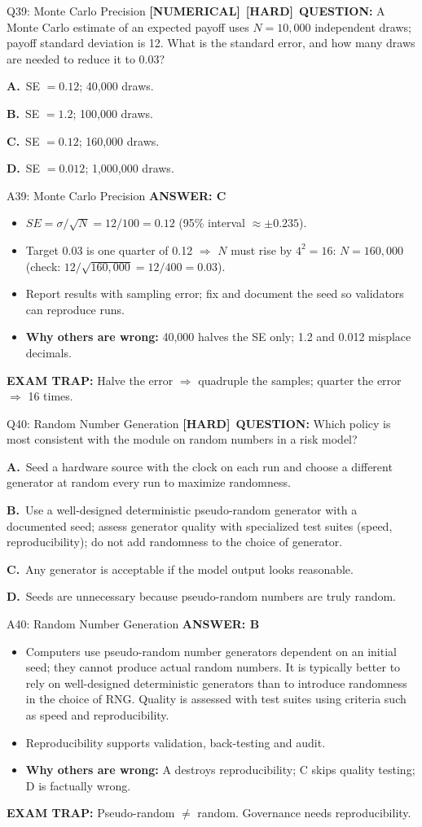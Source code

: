 \documentclass[8pt]{beamer}
\newcommand{\fs}{\fontsize{10}{12}\selectfont}
\newcommand{\opts}[4]{\par\vspace{0.12cm}\noindent\textbf{A.}~#1\par\vspace{0.08cm}\noindent\textbf{B.}~#2\par\vspace{0.08cm}\noindent\textbf{C.}~#3\par\vspace{0.08cm}\noindent\textbf{D.}~#4\par}
\newcommand{\ans}[1]{\textcolor{myblue}{\textbf{ANSWER: #1}}}
\newcommand{\trap}[1]{\textcolor{myred}{\textbf{EXAM TRAP:}} #1}
\newcommand{\numtag}{\textcolor{mypurple}{\textbf{[NUMERICAL]}}}
\newcommand{\hard}{\textcolor{myorange}{\textbf{[HARD]}}}
\begin{document}
\begin{frame}[t]{Q39: Monte Carlo Precision}
\fs
\numtag\ \hard\ \textbf{QUESTION:} A Monte Carlo estimate of an expected payoff uses $N=10{,}000$ independent draws; payoff standard deviation is 12. What is the standard error, and how many draws are needed to reduce it to 0.03?
\opts{SE $=0.12$; 40,000 draws.}
{SE $=1.2$; 100,000 draws.}
{SE $=0.12$; 160,000 draws.}
{SE $=0.012$; 1,000,000 draws.}
\end{frame}

\begin{frame}[t]{A39: Monte Carlo Precision}
\fs
\ans{C}
\begin{itemize}
\item $SE=\sigma/\sqrt N=12/100=\mathbf{0.12}$ (95\% interval $\approx\pm0.235$).
\item Target 0.03 is one quarter of 0.12 $\Rightarrow$ $N$ must rise by $4^2=16$: $N=160{,}000$ (check: $12/\sqrt{160{,}000}=12/400=0.03$).
\item Report results with sampling error; fix and document the seed so validators can reproduce runs.
\item \textbf{Why others are wrong:} 40,000 halves the SE only; 1.2 and 0.012 misplace decimals.
\end{itemize}
\trap{Halve the error $\Rightarrow$ quadruple the samples; quarter the error $\Rightarrow$ \textcolor{myblue}{16 times}.}
\end{frame}

\begin{frame}[t]{Q40: Random Number Generation}
\fs
\hard\ \textbf{QUESTION:} Which policy is most consistent with the module on random numbers in a risk model?
\opts{Seed a hardware source with the clock on each run and choose a different generator at random every run to maximize randomness.}
{Use a well-designed deterministic pseudo-random generator with a documented seed; assess generator quality with specialized test suites (speed, reproducibility); do not add randomness to the choice of generator.}
{Any generator is acceptable if the model output looks reasonable.}
{Seeds are unnecessary because pseudo-random numbers are truly random.}
\end{frame}

\begin{frame}[t]{A40: Random Number Generation}
\fs
\ans{B}
\begin{itemize}
\item Computers use pseudo-random number generators dependent on an initial seed; they cannot produce actual random numbers. It is typically better to rely on well-designed deterministic generators than to introduce randomness in the choice of RNG. Quality is assessed with test suites using criteria such as speed and reproducibility.
\item Reproducibility supports validation, back-testing and audit.
\item \textbf{Why others are wrong:} A destroys reproducibility; C skips quality testing; D is factually wrong.
\end{itemize}
\trap{Pseudo-random $\ne$ random. Governance needs \textcolor{myblue}{reproducibility}.}
\end{frame}
\end{document}
